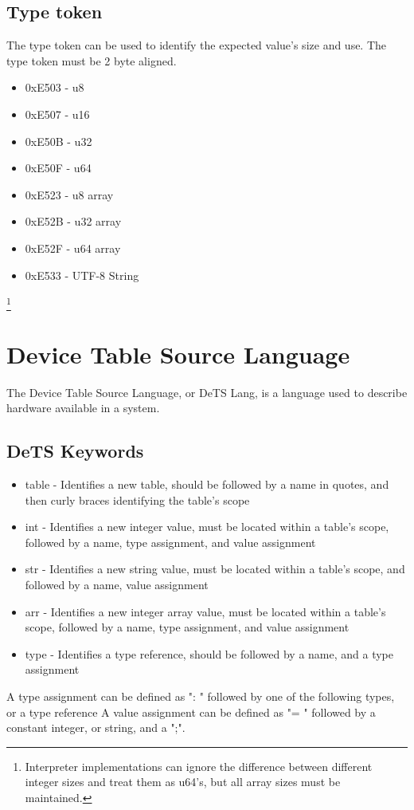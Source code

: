 \documentclass{article}
\begin{document}
\subsection{Type token}
The type token can be used to identify the expected value's size and use. The type token must be 2 byte aligned.
\begin{itemize}
    \item 0xE503 - u8
    \item 0xE507 - u16
    \item 0xE50B - u32
    \item 0xE50F - u64
    \item 0xE523 - u8 array
    \item 0xE52B - u32 array
    \item 0xE52F - u64 array
    \item 0xE533 - UTF-8 String
\end{itemize}
\footnote{Interpreter implementations can ignore the difference between different integer sizes and treat them as u64's, but all array sizes must be maintained.}

\pagebreak
\section{Device Table Source Language}
The Device Table Source Language, or DeTS Lang, is a language used to describe hardware available in a system.

\subsection{DeTS Keywords}
\begin{itemize}
    \item table - Identifies a new table, should be followed by a name in quotes, and then curly braces identifying the table's scope
    \item int - Identifies a new integer value, must be located within a table's scope, followed by a name, type assignment, and value assignment
    \item str - Identifies a new string value, must be located within a table's scope, and followed by a name, value assignment
    \item arr - Identifies a new integer array value, must be located within a table's scope, followed by a name, type assignment, and value assignment
    \item type - Identifies a type reference, should be followed by a name, and a type assignment
\end{itemize}
A type assignment can be defined as ": " followed by one of the following types, or a type reference 
A value assignment can be defined as "= " followed by a constant integer, or string, and a ";".
\end{document}
